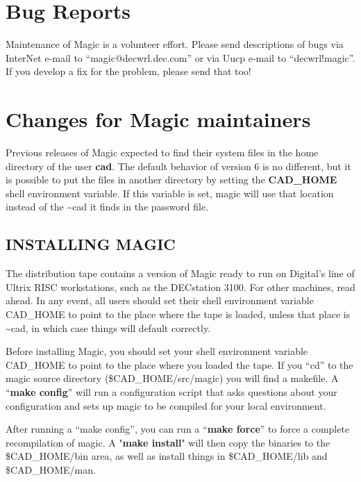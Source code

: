 \documentclass[letterpaper,twoside,12pt]{article}
\begin{document}
\section{Bug Reports}

Maintenance of Magic is a volunteer effort.  Please send descriptions
of bugs via InterNet e-mail to ``{\ttfamily magic@decwrl.dec.com}''
or via Uucp e-mail to ``{\ttfamily decwrl!magic}''.  If you develop a
fix for the problem, please send that too!  

\section{Changes for Magic maintainers}

Previous releases of Magic expected to find their
system files in the home directory of the user {\bfseries cad}.
The default behavior of version 6 is no different, but it
is possible to put the files in another directory by setting the
{\bfseries CAD{\_}HOME}
shell environment variable.  If this variable is set, magic will use that
location instead of the \~{}cad it finds in the password file.

\subsection{INSTALLING MAGIC}

The distribution tape contains a version of Magic ready to run on Digital's
line of Ultrix RISC workstations, such as the DECstation 3100.  For other 
machines, read ahead.
In any event, all users should set their shell environment variable 
CAD{\_}HOME to point to the place where the tape is loaded, unless that place
is \~{}cad, in which case things will default correctly.

Before installing Magic, you should set your shell environment variable 
CAD{\_}HOME to point to the place where you loaded the tape.
If you ``cd'' to the magic source directory (\${CAD{\_}HOME}/src/magic) you will find
a makefile.  A ``{\bfseries make config}'' will run a configuration script that asks
questions about your configuration and sets up magic to be compiled for your
local environment.

After running a ``make config'', you can run a ``{\bfseries make force}'' to force 
a complete
recompilation of magic.  A "{\bfseries make install}" will then copy the binaries to
the \${CAD{\_}HOME}/bin area, as well as install things in \${CAD{\_}HOME}/lib 
and \${CAD{\_}HOME}/man.  
\end{document}
